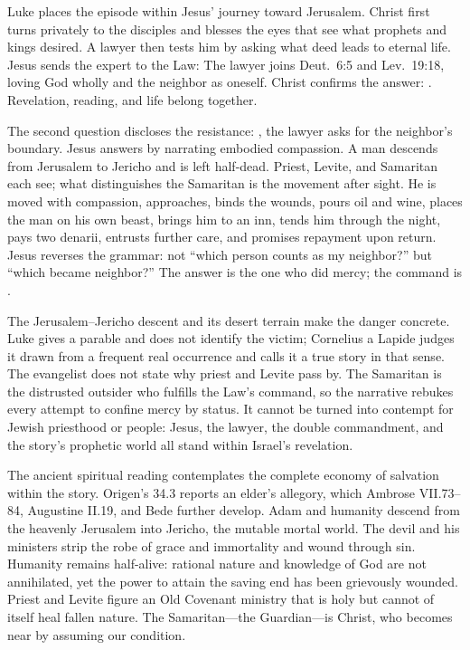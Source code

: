 Luke places the episode within Jesus' journey toward Jerusalem. Christ first
turns privately to the disciples and blesses the eyes that see what prophets
and kings desired. A lawyer then tests him by asking what deed leads to eternal
life. Jesus sends the expert to the Law:  The lawyer joins Deut.~6:5 and Lev.~19:18, loving God wholly and the
neighbor as oneself. Christ confirms the answer: .
Revelation, reading, and life belong together.

The second question discloses the resistance: , the lawyer asks for the neighbor's boundary. Jesus answers by
narrating embodied compassion. A man descends from Jerusalem to Jericho and is
left half-dead. Priest, Levite, and Samaritan each see; what distinguishes the
Samaritan is the movement after sight. He is moved with compassion, approaches,
binds the wounds, pours oil and wine, places the man on his own beast, brings
him to an inn, tends him through the night, pays two denarii, entrusts further
care, and promises repayment upon return. Jesus reverses the grammar: not
``which person counts as my neighbor?'' but ``which became neighbor?'' The
answer is the one who did mercy; the command is .

The Jerusalem--Jericho descent and its desert terrain make the danger
concrete. Luke gives a parable and does not identify the victim; Cornelius a
Lapide judges it drawn from a frequent real occurrence and calls it a true
story in that sense. The evangelist does not state why priest and Levite pass
by. The Samaritan is the distrusted outsider who fulfills the Law's command,
so the narrative rebukes every attempt to confine mercy by status. It cannot
be turned into contempt for Jewish priesthood or people: Jesus, the lawyer,
the double commandment, and the story's prophetic world all stand within
Israel's revelation.

The ancient spiritual reading contemplates the complete economy of salvation
within the story. Origen's  34.3 reports an elder's
allegory, which Ambrose VII.73--84, Augustine
 II.19, and Bede further develop. Adam and
humanity descend from the heavenly Jerusalem into Jericho, the mutable mortal
world. The devil and his ministers strip the robe of grace and immortality and
wound through sin. Humanity remains half-alive: rational nature and knowledge
of God are not annihilated, yet the power to attain the saving end has been
grievously wounded. Priest and Levite figure an Old Covenant ministry that is
holy but cannot of itself heal fallen nature. The Samaritan---the Guardian---is
Christ, who becomes near by assuming our condition.

